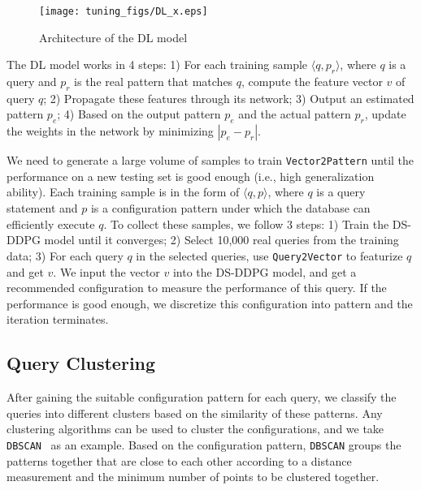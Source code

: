 

\begin{figure}[!t]\centering
\vspace{-.5em}
\texttt{[image: tuning\_figs/DL\_x.eps]}
\vspace{-2em}
\caption{Architecture of the DL model}
\label{fig:DL}
\vspace{-2.5em}
\end{figure} 


\vspace{.25em} 
The DL model works in 4 steps: 1) For each training sample $\langle q, p_r\rangle$, where $q$ is a query and $p_r$ is the real pattern that matches $q$,  compute the feature vector $v$ of query $q$; 2)  Propagate these features through its network; 3) Output an estimated  pattern $p_e$; 4) Based on the output pattern $p_e$ and the actual pattern $p_r$, update the weights in the network by minimizing $|p_e-p_r|$. 



\vspace{.25em} 
 We need to generate a large volume of samples to train \texttt{Vector2Pattern} until the performance on a new testing set is good enough (i.e., high generalization ability). Each training sample is in the form of $\langle q, p\rangle$, where $q$ is a query statement  and $p$ is a configuration pattern under which the database can efficiently execute $q$. To collect these samples, we follow 3 steps: 1) Train the DS-DDPG model until it converges; 2) Select 10,000 real queries from the training data; 3) For each query $q$ in the selected queries, use \texttt{Query2Vector} to featurize $q$ and get $v$. We input the vector $v$ into the DS-DDPG model, and get a recommended configuration to measure the performance of this query. If the performance is good enough, we discretize this configuration into  pattern  %
and the iteration terminates. 


\vspace{-.25em}
\subsection{Query Clustering}
\vspace{-.25em}


After gaining the suitable configuration pattern for each query, we classify the queries into different clusters based on the similarity of these patterns. Any clustering algorithms can be used to cluster the configurations, and we take {\tt DBSCAN}~\cite{DBLP:conf/kdd/EsterKSX96} as an example. Based on the configuration pattern,  {\tt DBSCAN} groups the patterns together that are close to each other according to a distance measurement and the minimum number of points to be clustered together. 


